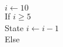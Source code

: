\documentclass[preview]{standalone}
\begin{document}
\begin{center}
\begin{algorithmic}
            \State $i \gets 10$ 
            \\If {$i\geq 5$}
            \\State $i \gets i-1$
            \\Else
            \end{algorithmic}
\end{center}
\end{document}
